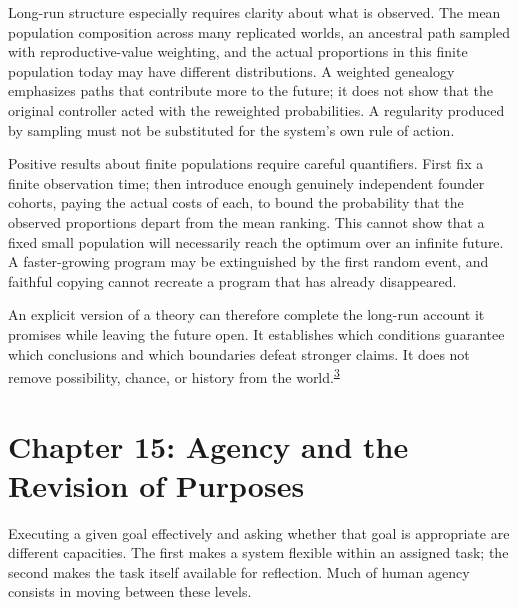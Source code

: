 \documentclass[
  english,
  11pt,
  oneside]{book}
\begin{document}
Long-run structure especially requires clarity about what is observed. The mean population composition across many replicated worlds, an ancestral path sampled with reproductive-value weighting, and the actual proportions in this finite population today may have different distributions. A weighted genealogy emphasizes paths that contribute more to the future; it does not show that the original controller acted with the reweighted probabilities. A regularity produced by sampling must not be substituted for the system's own rule of action.

Positive results about finite populations require careful quantifiers. First fix a finite observation time; then introduce enough genuinely independent founder cohorts, paying the actual costs of each, to bound the probability that the observed proportions depart from the mean ranking. This cannot show that a fixed small population will necessarily reach the optimum over an infinite future. A faster-growing program may be extinguished by the first random event, and faithful copying cannot recreate a program that has already disappeared.

\begingroup{}

An explicit version of a theory can therefore complete the long-run account it promises while leaving the future open. It establishes which conditions guarantee which conclusions and which boundaries defeat stronger claims. It does not remove possibility, chance, or history from the world.\textsuperscript{\hyperlink{ph-note-3}{3}}

\par\endgroup

\chapter{Chapter 15: Agency and the Revision of Purposes}\label{ph-ch-15}

Executing a given goal effectively and asking whether that goal is appropriate are different capacities. The first makes a system flexible within an assigned task; the second makes the task itself available for reflection. Much of human agency consists in moving between these levels.
\end{document}

